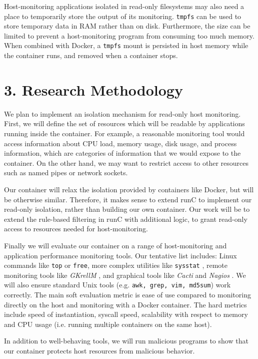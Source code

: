 \documentclass{proc}
\begin{document}
Host-monitoring applications isolated in read-only filesystems may also need a place to temporarily store the output of its monitoring. \texttt{tmpfs} can be used to store temporary data in RAM rather than on disk. Furthermore, the size can be limited to prevent a host-monitoring program from consuming too much memory. When combined with Docker, a \texttt{tmpfs} mount is persisted in host memory while the container runs, and removed when a container stops. 

\section*{3. Research Methodology}

We plan to implement an isolation mechanism for read-only host monitoring. First, we will define the set of resources which will be readable by applications running inside the container. For example, a reasonable monitoring tool would access information about CPU load, memory usage, disk usage, and process information, which are categories of information that we would expose to the container. On the other hand, we may want to restrict access to other resources such as named pipes or network sockets.

Our container will relax the isolation provided by containers like Docker, but will be otherwise similar. Therefore, it makes sense to extend runC to implement our read-only isolation, rather than building our own container. Our work will be to extend the rule-based filtering in runC with additional logic, to grant read-only access to resources needed for host-monitoring. 

Finally we will evaluate our container on a range of host-monitoring and application performance monitoring tools. Our tentative list includes: Linux commands like \texttt{top} or \texttt{free}, more complex utilities like \texttt{sysstat} \cite{sysstat}, remote monitoring tools like \textit{GKrellM} \cite{gkrellm}, and graphical tools like \textit{Cacti} \cite{cacti} and \textit{Nagios} \cite{nagios}. We will also ensure standard Unix tools (e.g. \texttt{awk, grep, vim, md5sum}) work correctly. The main soft evaluation metric is ease of use compared to monitoring directly on the host and monitoring with a Docker container. The hard metrics include speed of instantiation, syscall speed, scalability with respect to memory and CPU usage (i.e. running multiple containers on the same host). 

In addition to well-behaving tools, we will run malicious programs to show that our container protects host resources from malicious behavior.
\end{document}
